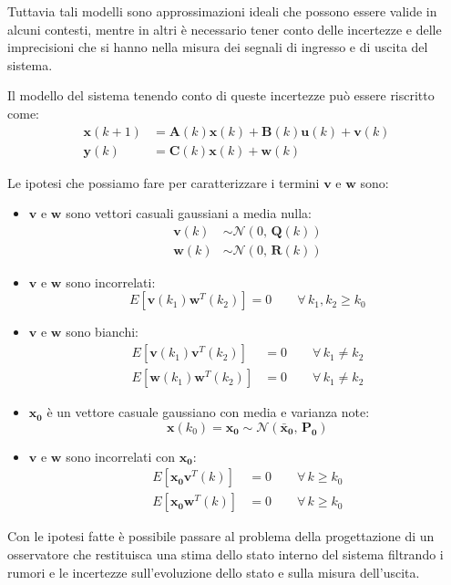 \documentclass[12pt,a4paper]{article}
\newcommand*{\matr}{\mathbf}
\newcommand*{\vett}{\mathbf}
\begin{document}
Tuttavia tali modelli sono approssimazioni ideali che possono essere valide in alcuni contesti, mentre in altri è necessario tener conto delle incertezze e delle imprecisioni che si hanno nella misura dei segnali di ingresso e di uscita del sistema.

Il modello del sistema tenendo conto di queste incertezze può essere riscritto come:
\begin{align*}
\vett{x}(k+1) &= \matr{A}(k)\vett{x}(k) + \matr{B}(k)\vett{u}(k) + \vett{v}(k) \\
\vett{y}(k) &= \matr{C}(k)\vett{x}(k) + \vett{w}(k)
\end{align*}

\noindent Le ipotesi che possiamo fare per caratterizzare i termini $\vett{v}$ e $\vett{w}$ sono:
\begin{itemize}
\item $\vett{v}$ e $\vett{w}$ sono vettori casuali gaussiani a media nulla: 
\begin{align*}
 \vett{v}(k) &\sim \mathcal{N}(0,\,\matr{Q}(k)) \\
 \vett{w}(k) &\sim \mathcal{N}(0,\,\matr{R}(k))
\end{align*}
\item $\vett{v}$ e $\vett{w}$ sono incorrelati:
 \[E[\vett{v}(k_1)\vett{w}^T(k_2)]=0\qquad \forall\, k_1,k_2 \geq k_0\]
\item $\vett{v}$ e $\vett{w}$ sono bianchi: 
\begin{align*}
 E[\vett{v}(k_1)\vett{v}^T(k_2)]&=0\qquad \forall\, k_1 \neq k_2 \\
 E[\vett{w}(k_1)\vett{w}^T(k_2)]&=0\qquad \forall\, k_1 \neq k_2
\end{align*}
\item $\vett{x_0}$ è un vettore casuale gaussiano con media e varianza note:
\[\vett{x}(k_0)=\vett{x_0} \sim \mathcal{N}(\vett{\bar{x}_0},\,\matr{P_0})\]
\item $\vett{v}$ e $\vett{w}$ sono incorrelati con $\vett{x_0}$:
\begin{align*}
 E[\vett{x_0}\vett{v}^T(k)]&=0\qquad \forall\, k \geq k_0 \\
 E[\vett{x_0}\vett{w}^T(k)]&=0\qquad \forall\, k \geq k_0
\end{align*}
\end{itemize}

Con le ipotesi fatte è possibile passare al problema della progettazione di un osservatore che restituisca una stima dello stato interno del sistema filtrando i rumori e le incertezze sull'evoluzione dello stato e sulla misura dell'uscita.
\end{document}
